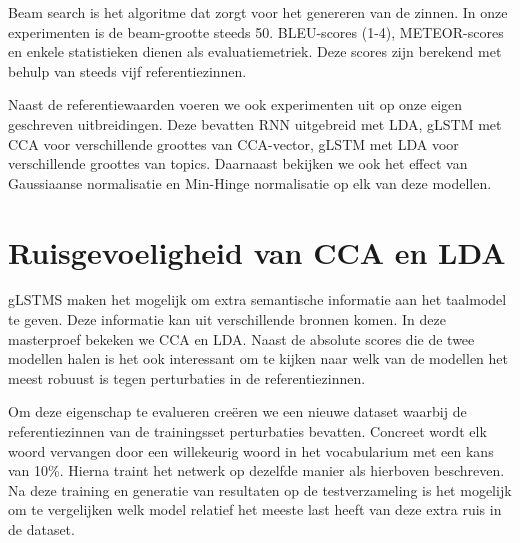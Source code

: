 Beam search is het algoritme dat zorgt voor het genereren van de zinnen. In onze experimenten is de beam-grootte steeds 50.
BLEU-scores (1-4), METEOR-scores en enkele statistieken dienen als evaluatiemetriek. Deze scores zijn berekend met behulp van steeds vijf referentiezinnen.

Naast de referentiewaarden voeren we ook experimenten uit op onze eigen geschreven uitbreidingen.
Deze bevatten RNN uitgebreid met LDA, gLSTM met CCA voor verschillende groottes van CCA-vector, gLSTM met LDA voor verschillende groottes van topics. Daarnaast bekijken we ook het effect van Gaussiaanse normalisatie en Min-Hinge normalisatie op elk van deze modellen.

\section{Ruisgevoeligheid van CCA en LDA} %
\label{sec:ruisgevoeligheid_van_cca_en_lda}
gLSTMS maken het mogelijk om extra semantische informatie aan het taalmodel te geven. Deze informatie kan uit verschillende bronnen komen. In deze masterproef bekeken we CCA en LDA. Naast de absolute scores die de twee modellen halen is het ook interessant om te kijken naar welk van de modellen het meest robuust is tegen perturbaties in de referentiezinnen.

Om deze eigenschap te evalueren cre\"eren we een nieuwe dataset waarbij de referentiezinnen van de trainingsset perturbaties bevatten.
Concreet wordt elk woord vervangen door een willekeurig woord in het vocabularium met een kans van 10\%. Hierna traint het netwerk op dezelfde manier als hierboven beschreven. Na deze training en generatie van resultaten op de testverzameling is het mogelijk om te vergelijken welk model relatief het meeste last heeft van deze extra ruis in de dataset.


